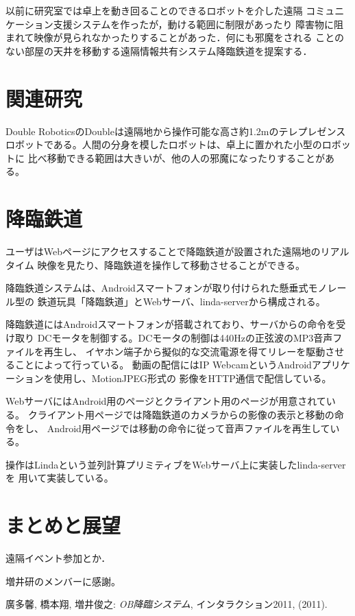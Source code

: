 \documentclass[submit,techreq]{ipsj}
\begin{document}
以前に研究室では卓上を動き回ることのできるロボットを介した遠隔
コミュニケーション支援システムを作ったが，動ける範囲に制限があったり
障害物に阻まれて映像が見られなかったりすることがあった．何にも邪魔をされる
ことのない部屋の天井を移動する遠隔情報共有システム降臨鉄道を提案する．

\section{関連研究}

Double RoboticsのDoubleは遠隔地から操作可能な高さ約1.2mのテレプレゼンス
ロボットである。人間の分身を模したロボットは、卓上に置かれた小型のロボットに
比べ移動できる範囲は大きいが、他の人の邪魔になったりすることがある。

\footnotetext{}

\section{降臨鉄道}

ユーザはWebページにアクセスすることで降臨鉄道が設置された遠隔地のリアルタイム
映像を見たり、降臨鉄道を操作して移動させることができる。

降臨鉄道システムは、Androidスマートフォンが取り付けられた懸垂式モノレール型の
鉄道玩具「降臨鉄道」とWebサーバ、linda-serverから構成される。

降臨鉄道にはAndroidスマートフォンが搭載されており、サーバからの命令を受け取り
DCモータを制御する。DCモータの制御は440Hzの正弦波のMP3音声ファイルを再生し、
イヤホン端子から擬似的な交流電源を得てリレーを駆動させることによって行っている。
動画の配信にはIP WebcamというAndroidアプリケーションを使用し、MotionJPEG形式の
影像をHTTP通信で配信している。

WebサーバにはAndroid用のページとクライアント用のページが用意されている。
クライアント用ページでは降臨鉄道のカメラからの影像の表示と移動の命令をし、
Android用ページでは移動の命令に従って音声ファイルを再生している。

操作はLindaという並列計算プリミティブをWebサーバ上に実装したlinda-serverを
用いて実装している。

\section{まとめと展望}

遠隔イベント参加とか．


\begin{acknowledgment}
増井研のメンバーに感謝。
\end{acknowledgment}


\begin{thebibliography}{10}

廣多馨, 橋本翔, 増井俊之:
{\it OB降臨システム},
インタラクション2011, (2011).

\end{thebibliography}
\end{document}
